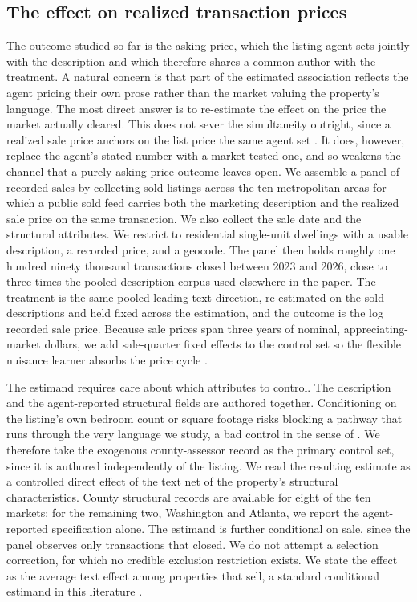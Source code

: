 \subsection{The effect on realized transaction prices}
\label{sec:saleprice}

The outcome studied so far is the asking price, which the listing agent sets jointly
with the description and which therefore shares a common author with the treatment.
A natural concern is that part of the estimated association reflects the agent
pricing their own prose rather than the market valuing the property's language. The
most direct answer is to re-estimate the effect on the price the market actually
cleared. This does not sever the simultaneity outright, since a realized sale price anchors on the list price the same agent set \citep{genesove2001loss}. It does, however, replace the agent's stated number with a market-tested one, and so weakens the channel that a purely asking-price outcome leaves open. We assemble a panel of recorded sales by collecting sold listings across the ten metropolitan areas for which a public sold feed carries both the marketing description and the realized sale price on the same transaction. We also collect the sale date and the structural attributes. We restrict to residential single-unit dwellings with a usable description, a recorded price, and a geocode. The panel then holds roughly one hundred ninety thousand transactions closed between 2023 and 2026, close to three times the pooled description corpus used elsewhere in the paper. The treatment is the same pooled leading text direction,
re-estimated on the sold descriptions and held fixed across the estimation, and the
outcome is the log recorded sale price. Because sale prices span three years of
nominal, appreciating-market dollars, we add sale-quarter fixed effects to the
control set so the flexible nuisance learner absorbs the price cycle
\citep{rosen1974hedonic, case1989efficiency}.

The estimand requires care about which attributes to control. The description and the agent-reported structural fields are authored together. Conditioning on the listing's own bedroom count or square footage risks blocking a pathway that runs through the very language we study, a bad control in the sense of \citet{cinelli2024crash}. We therefore take the exogenous county-assessor record as the primary control set, since it is authored independently of the listing. We read the resulting estimate as a controlled direct effect of the text net of the property's structural characteristics. County structural records are available for
eight of the ten markets; for the remaining two, Washington and Atlanta, we report
the agent-reported specification alone. The estimand is further conditional on sale,
since the panel observes only transactions that closed. We do not attempt a selection correction, for which no credible exclusion restriction exists. We state the effect as the average text effect among properties that sell, a standard conditional estimand in this literature \citep{heckman1979selection, munneke2000empirical}.

